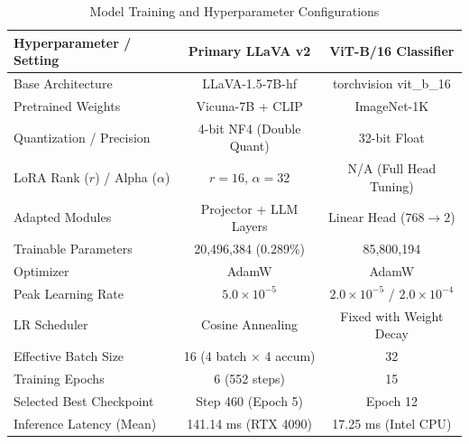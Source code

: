\begin{table}[ht]
\centering
\caption{Model Training and Hyperparameter Configurations}
\label{tab:hyperparameters}
\begin{tabular}{lcc}
\toprule
\textbf{Hyperparameter / Setting} & \textbf{Primary LLaVA v2} & \textbf{ViT-B/16 Classifier} \\
\midrule
Base Architecture & LLaVA-1.5-7B-hf & torchvision vit\_b\_16 \\
Pretrained Weights & Vicuna-7B + CLIP & ImageNet-1K \\
Quantization / Precision & 4-bit NF4 (Double Quant) & 32-bit Float \\
LoRA Rank ($r$) / Alpha ($\alpha$) & $r = 16$, $\alpha = 32$ & N/A (Full Head Tuning) \\
Adapted Modules & Projector + LLM Layers & Linear Head ($768 \to 2$) \\
Trainable Parameters & 20,496,384 (0.289\%) & 85,800,194 \\
Optimizer & AdamW & AdamW \\
Peak Learning Rate & $5.0 \times 10^{-5}$ & $2.0 \times 10^{-5}$ / $2.0 \times 10^{-4}$ \\
LR Scheduler & Cosine Annealing & Fixed with Weight Decay \\
Effective Batch Size & 16 (4 batch $\times$ 4 accum) & 32 \\
Training Epochs & 6 (552 steps) & 15 \\
Selected Best Checkpoint & Step 460 (Epoch 5) & Epoch 12 \\
Inference Latency (Mean) & 141.14 ms (RTX 4090) & 17.25 ms (Intel CPU) \\
\bottomrule
\end{tabular}
\end{table}
